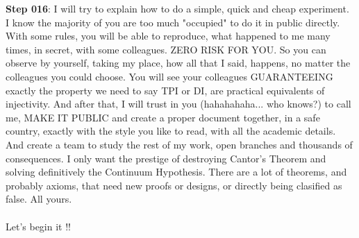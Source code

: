 		\noindent
		\textbf{Step 016}: I will try to explain how to do a simple, quick and cheap experiment. I know the majority of you are too much "occupied" to do it in public directly. With some rules, you will be able to reproduce, what happened to me many times, in secret, with some colleagues. ZERO RISK FOR YOU. So you can observe by yourself, taking my place, how all that I said, happens, no matter the colleagues you could choose. You will see your colleagues GUARANTEEING exactly the property we need to say TPI or DI, are practical equivalents of injectivity. And after that, I will trust in you (hahahahaha... who knows?) to call me, MAKE IT PUBLIC and create a proper document together, in a safe country, exactly with the style you like to read, with all the academic details. And create a team to study the rest of my work, open branches and thousands of consequences. I only want the prestige of destroying Cantor's Theorem and solving definitively the Continuum Hypothesis. There are a lot of theorems, and probably axioms, that need new proofs or designs, or directly being clasified as false. All yours.
		\\\\
	
		\noindent
		Let's begin it !!
	
	
	
	
		
	
	
	


\newpage